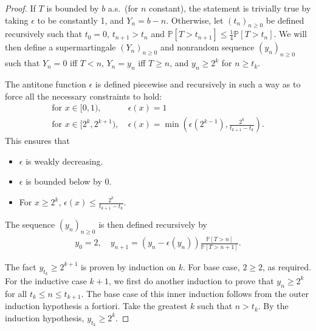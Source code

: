 \begin{proof}
If $T$ is bounded by $b$ a.s.~(for $n$ constant), the statement is trivially true by taking $\epsilon$ to be constantly 1, and $Y_n = b - n$.
Otherwise, let $(t_n)_{n \geq 0}$ be defined recursively such that $t_0 = 0$, $t_{n+1} > t_n$ and $\mathbb P[T > t_{n+1}] \leq \frac 1 4 \mathbb P[T > t_n]$.
We will then define a supermartingale $(Y_n)_{n \geq 0}$ and nonrandom sequence $(y_n)_{n \geq 0}$ such that $Y_n = 0$ iff $T < n$, $Y_n = y_n$ iff $T \geq n$, and $y_n \geq 2^k$ for $n \geq t_k$.

The antitone function $\epsilon$ is defined piecewise and recursively in such a way as to force all the necessary constraints to hold:
\begin{align*}
    \text{for }x \in [0,1),\ &\epsilon(x) = 1 \\
    \text{for }x \in [2^k,2^{k+1}),\ &\epsilon(x) = \min \left (\epsilon(2^{k-1}), \frac{2^k}{t_{k+1}-t_k} \right ).
\end{align*}
This ensures that
\begin{itemize}
\item $\epsilon$ is weakly decreasing. 
\item $\epsilon$ is bounded below by 0.
\item For $x \geq 2^k$, $\epsilon(x) \leq \frac{2^k}{t_{k+1}-t_k}$. 
\end{itemize}

The sequence $(y_n)_{n \geq 0}$ is then defined recursively by
\begin{align*}
    y_0 = 2, \quad
    y_{n+1} = (y_n - \epsilon(y_n)) \frac{\mathbb P[T > n]}{\mathbb P[T > n+1]}.
\end{align*}

The fact $y_{t_k} \geq 2^{k+1}$ is proven by induction on $k$. For base case, $2 \geq 2$, as required. For the inductive case $k+1$, we first do another induction to prove that $y_n \geq 2^k$ for all $t_k \leq n \leq t_{k+1}$. The base case of this inner induction follows from the outer induction hypothesis a fortiori. Take the greatest $k$ such that $n > t_k$. By the induction hypothesis, $y_{t_k} \geq 2^k$.


\end{proof}
